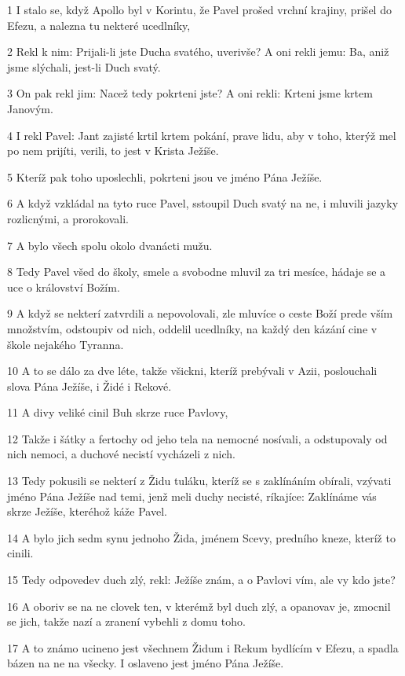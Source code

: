 \par 1 I stalo se, když Apollo byl v Korintu, že Pavel prošed vrchní krajiny, prišel do Efezu, a nalezna tu nekteré ucedlníky,
\par 2 Rekl k nim: Prijali-li jste Ducha svatého, uverivše? A oni rekli jemu: Ba, aniž jsme slýchali, jest-li Duch svatý.
\par 3 On pak rekl jim: Nacež tedy pokrteni jste? A oni rekli: Krteni jsme krtem Janovým.
\par 4 I rekl Pavel: Jant zajisté krtil krtem pokání, prave lidu, aby v toho, kterýž mel po nem prijíti, verili, to jest v Krista Ježíše.
\par 5 Kteríž pak toho uposlechli, pokrteni jsou ve jméno Pána Ježíše.
\par 6 A když vzkládal na tyto ruce Pavel, sstoupil Duch svatý na ne, i mluvili jazyky rozlicnými, a prorokovali.
\par 7 A bylo všech spolu okolo dvanácti mužu.
\par 8 Tedy Pavel všed do školy, smele a svobodne mluvil za tri mesíce, hádaje se a uce o království Božím.
\par 9 A když se nekterí zatvrdili a nepovolovali, zle mluvíce o ceste Boží prede vším množstvím, odstoupiv od nich, oddelil ucedlníky, na každý den kázání cine v škole nejakého Tyranna.
\par 10 A to se dálo za dve léte, takže všickni, kteríž prebývali v Azii, poslouchali slova Pána Ježíše, i Židé i Rekové.
\par 11 A divy veliké cinil Buh skrze ruce Pavlovy,
\par 12 Takže i šátky a fertochy od jeho tela na nemocné nosívali, a odstupovaly od nich nemoci, a duchové necistí vycházeli z nich.
\par 13 Tedy pokusili se nekterí z Židu tuláku, kteríž se s zaklínáním obírali, vzývati jméno Pána Ježíše nad temi, jenž meli duchy necisté, ríkajíce: Zaklínáme vás skrze Ježíše, kteréhož káže Pavel.
\par 14 A bylo jich sedm synu jednoho Žida, jménem Scevy, predního kneze, kteríž to cinili.
\par 15 Tedy odpovedev duch zlý, rekl: Ježíše znám, a o Pavlovi vím, ale vy kdo jste?
\par 16 A oboriv se na ne clovek ten, v kterémž byl duch zlý, a opanovav je, zmocnil se jich, takže nazí a zranení vybehli z domu toho.
\par 17 A to známo ucineno jest všechnem Židum i Rekum bydlícím v Efezu, a spadla bázen na ne na všecky. I oslaveno jest jméno Pána Ježíše.
